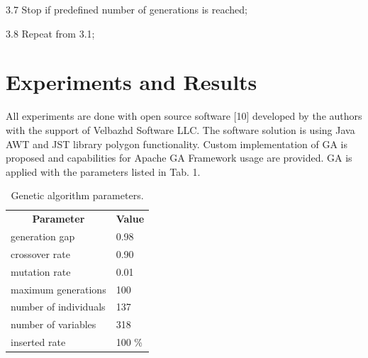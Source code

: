 \documentclass{llncs}
\begin{document}
\hspace{4 mm} 3.7 Stop if predefined number of generations is reached;

\hspace{4 mm} 3.8 Repeat from 3.1;%
\section{Experiments and Results}
%
All experiments are done with open source software [10] developed by the authors with the support of Velbazhd Software LLC. The software solution is using Java AWT and JST library polygon functionality. Custom implementation of GA is proposed and capabilities for Apache GA Framework usage are provided. GA is applied with the parameters listed in Tab. 1.
%
\begin{table}[]
\centering
\label{tab1}
\begin{tabular}{@{}ll@{}}
\multicolumn{1}{c}{{ \textbf{Parameter}}} & \multicolumn{1}{c}{{\textbf{Value}}} \\
\multicolumn{1}{|l|}{generation gap}                                                  & \multicolumn{1}{l|}{0.98}                                                         \\
\multicolumn{1}{|l|}{crossover rate}                                                  & \multicolumn{1}{l|}{0.90}                                                         \\
\multicolumn{1}{|l|}{mutation rate}                                                   & \multicolumn{1}{l|}{0.01}                                                         \\
\multicolumn{1}{|l|}{maximum generations}                                             & \multicolumn{1}{l|}{100}                                                         \\
\multicolumn{1}{|l|}{number of individuals}                                           & \multicolumn{1}{l|}{137}                                                           \\
\multicolumn{1}{|l|}{number of variables}                                             & \multicolumn{1}{l|}{318}                                                     \\
\multicolumn{1}{|l|}{inserted rate}                                                                       & \multicolumn{1}{l|}{100 \%}                                                                            \\
\end{tabular}
\vspace{2 mm}
\caption{Genetic algorithm parameters.}
\end{table}
\end{document}
